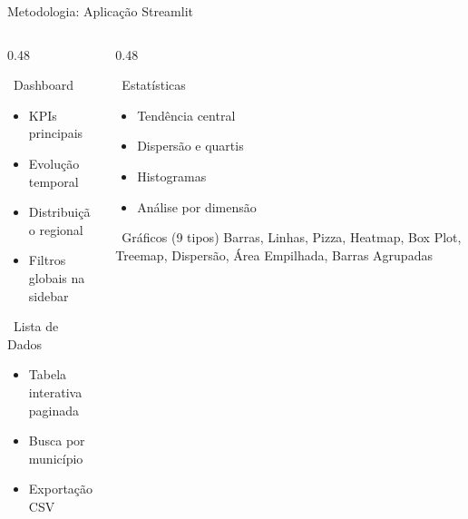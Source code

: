 \documentclass[aspectratio=169,10pt]{beamer}
\begin{document}
\begin{frame}{Metodologia: Aplicação Streamlit}

\begin{columns}[T]
\begin{column}{0.48\textwidth}
    \begin{block}{\faHome\ Dashboard}
    \begin{itemize}
        \item KPIs principais
        \item Evolução temporal
        \item Distribuição regional
        \item Filtros globais na sidebar
    \end{itemize}
    \end{block}

    \begin{block}{\faList\ Lista de Dados}
    \begin{itemize}
        \item Tabela interativa paginada
        \item Busca por município
        \item Exportação CSV
    \end{itemize}
    \end{block}
\end{column}
\begin{column}{0.48\textwidth}
    \begin{block}{\faChartBar\ Estatísticas}
    \begin{itemize}
        \item Tendência central
        \item Dispersão e quartis
        \item Histogramas
        \item Análise por dimensão
    \end{itemize}
    \end{block}

    \begin{block}{\faChartArea\ Gráficos (9 tipos)}
    Barras, Linhas, Pizza, Heatmap,
    Box Plot, Treemap, Dispersão,
    Área Empilhada, Barras Agrupadas
    \end{block}
\end{column}
\end{columns}

\end{frame}
\end{document}
